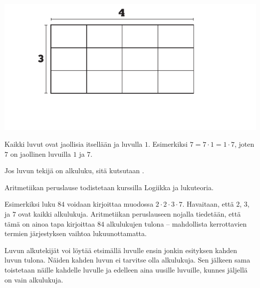 \begin{center}
\includegraphics[scale=0.85]{pictures/Kuva2-4-3x4.pdf}
\end{center}
    
Kaikki luvut ovat jaollisia itsellään ja luvulla $1$. Esimerkiksi $7=7 \cdot 1=1 \cdot 7$, joten $7$ on jaollinen luvuilla $1$ ja $7$.
    

\begin{esimerkki}
\end{esimerkki}

Jos luvun tekijä on alkuluku, sitä kutsutaan .

% 	


Aritmetiikan peruslause todistetaan kurssilla Logiikka ja lukuteoria.
    
Esimerkiksi luku $84$ voidaan kirjoittaa muodossa $2\cdot 2\cdot 3\cdot 7$. Havaitaan, että $2$, $3$, ja $7$ ovat kaikki alkulukuja. Aritmetiikan peruslauseen nojalla tiedetään, että tämä on ainoa tapa kirjoittaa $84$ alkulukujen tulona -- mahdollista kerrottavien termien järjestyksen vaihtoa lukuunottamatta.
    
Luvun alkutekijät voi löytää etsimällä luvulle ensin jonkin esityksen kahden luvun tulona. Näiden kahden luvun ei tarvitse olla alkulukuja. Sen jälkeen sama toistetaan näille kahdelle luvulle ja edelleen aina uusille luvuille, kunnes jäljellä on vain alkulukuja.

% 	


